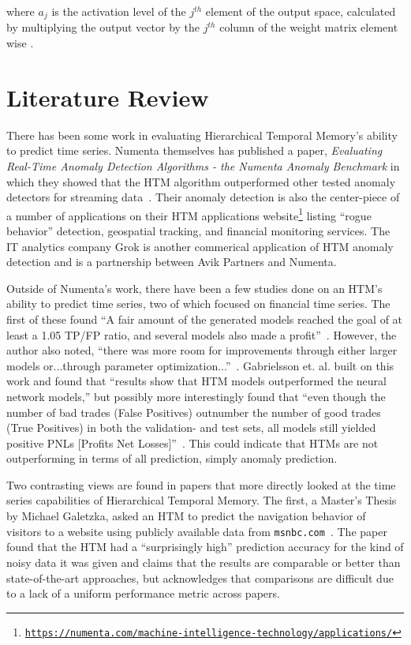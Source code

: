 \documentclass[oneside,12pt,openany]{book}
\begin{document}
	
	 \noindent where $a_{j}$ is the activation level of the $j^{th}$ element of the output space, calculated by multiplying the output vector by the $j^{th}$ column of the weight matrix element wise \cite{Dillon}. 
	
	\chapter{Literature Review}
	
	
	There has been some work in evaluating Hierarchical Temporal Memory's ability to predict time series. Numenta themselves has published a paper, \textit{Evaluating Real-Time Anomaly Detection Algorithms - the Numenta Anomaly Benchmark} in which they showed that the HTM algorithm outperformed other tested anomaly detectors for streaming data~\cite{NAB}. Their anomaly detection is also the center-piece of a number of applications on their HTM applications website\footnote{\href{https://numenta.com/machine-intelligence-technology/applications/}{\texttt{https://numenta.com/machine-intelligence-technology/applications/}}} listing ``rogue behavior'' detection, geospatial tracking, and financial monitoring services. The IT analytics company Grok is another commerical application of HTM anomaly detection and is a partnership between Avik Partners and Numenta.
	
	Outside of Numenta's work, there have been a few studies done on an HTM's ability to predict time series, two of which focused on financial time series. The first of these found ``A fair amount of the generated models reached the goal of at least a 1.05 TP/FP ratio, and several models also made a profit''~\cite{Evaluation}. However, the author also noted, ``there was more room for improvements through either larger models or...through parameter optimization...''~\cite{Evaluation}. Gabrielsson et. al. built on this work and found that ``results show that HTM models outperformed the neural network models,'' but possibly more interestingly found that ``even though the number of bad trades (False Positives) outnumber the number of good trades (True Positives) in both the validation- and test sets, all models still yielded positive PNLs [Profits Net Losses]''~\cite{EvolvingTrading}. This could indicate that HTMs are not outperforming in terms of all prediction, simply anomaly prediction.
	
	Two contrasting views are found in papers that more directly looked at the time series capabilities of Hierarchical Temporal Memory. The first, a Master's Thesis by Michael Galetzka, asked an HTM to predict the navigation behavior of visitors to a website using publicly available data from \texttt{msnbc.com}~\cite{Galetzka}. The paper found that the HTM had a ``surprisingly high'' prediction accuracy for the kind of noisy data it was given and claims that the results are comparable or better than state-of-the-art approaches, but acknowledges that comparisons are difficult due to a lack of a uniform performance metric across papers.
	
\end{document}
